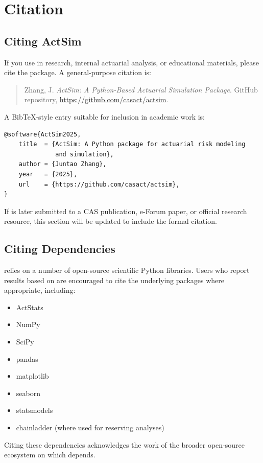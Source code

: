 \chapter{Citation}
\label{chap:citation}

\section{Citing ActSim}

If you use \actsim in research, internal actuarial analysis, or
educational materials, please cite the package. A general-purpose
citation is:

\begin{quote}
Zhang, J. \emph{ActSim: A Python-Based Actuarial Simulation Package}.
GitHub repository, \url{https://github.com/casact/actsim}.
\end{quote}

A BibTeX-style entry suitable for inclusion in academic work is:

\begin{lstlisting}[style=bashstyle]
@software{ActSim2025,
    title  = {ActSim: A Python package for actuarial risk modeling
              and simulation},
    author = {Juntao Zhang},
    year   = {2025},
    url    = {https://github.com/casact/actsim},
}
\end{lstlisting}

If \actsim is later submitted to a CAS publication, e-Forum paper, or
official research resource, this section will be updated to include
the formal citation.

\section{Citing Dependencies}

\actsim relies on a number of open-source scientific Python libraries.
Users who report results based on \actsim are encouraged to cite the
underlying packages where appropriate, including:

\begin{itemize}[leftmargin=*]
    \item ActStats
    \item NumPy
    \item SciPy
    \item pandas
    \item matplotlib
    \item seaborn
    \item statsmodels
    \item chainladder (where used for reserving analyses)
\end{itemize}

Citing these dependencies acknowledges the work of the broader
open-source ecosystem on which \actsim depends.
